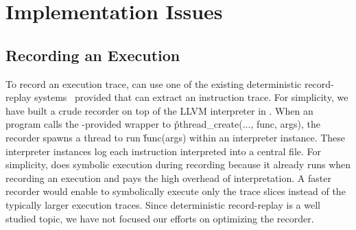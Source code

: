 \section{Implementation Issues} \label{sec:impl}


\subsection{Recording an Execution} \label{sec:record}

To record an execution trace, \peregrine can use one of the existing
deterministic record-replay
systems~\cite{scribe:sigmetrics10,smp-revirt:vee08,idna:vee06} provided
that \peregrine can extract an instruction trace.  For simplicity, we have built
a crude recorder on top of the LLVM interpreter in \klee.  When an program
calls the \peregrine-provided wrapper to \v{pthread\_create(..., func, args)},
the recorder spawns a thread to run \v{func(args)}
within an interpreter instance.  These interpreter instances log
each instruction interpreted into a central file.
For simplicity, \peregrine does symbolic execution during recording because it
already runs \klee when recording an execution and pays the high overhead
of interpretation.  A faster recorder would enable \peregrine to
symbolically execute only the trace slices instead of the typically larger
execution traces.  Since deterministic record-replay is a well
studied topic, we have not focused our efforts on optimizing the recorder.





